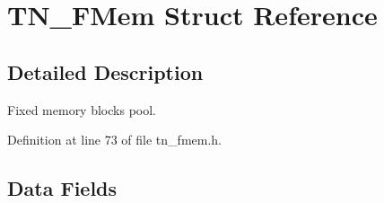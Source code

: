\hypertarget{structTN__FMem}{\section{T\+N\+\_\+\+F\+Mem Struct Reference}
\label{structTN__FMem}
}


\subsection{Detailed Description}
Fixed memory blocks pool. 

Definition at line 73 of file tn\+\_\+fmem.\+h.

\subsection*{Data Fields}
